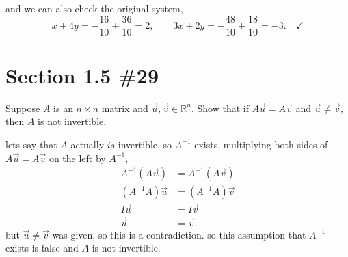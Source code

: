 \documentclass[12pt]{article}
\begin{document}
and we can also check the original system,
\[
x + 4y = -\frac{16}{10} + \frac{36}{10} = 2, \qquad
3x + 2y = -\frac{48}{10} + \frac{18}{10} = -3. \quad \checkmark
\]

\section*{Section 1.5 \#29}

Suppose $A$ is an $n \times n$ matrix and $\vec{u}, \vec{v} \in \mathbb{R}^n$. Show that if $A\vec{u} = A\vec{v}$ and $\vec{u} \neq \vec{v}$, then $A$ is not invertible.

\medskip

lets say that $A$ actually $is$ invertible, so $A^{-1}$ exists. multiplying both sides of $A\vec{u} = A\vec{v}$ on the left by $A^{-1}$,
\begin{align*}
A^{-1}(A\vec{u}) &= A^{-1}(A\vec{v}) \\
(A^{-1}A)\vec{u} &= (A^{-1}A)\vec{v} \\
I\vec{u} &= I\vec{v} \\
\vec{u} &= \vec{v}.
\end{align*}
but $\vec{u} \neq \vec{v}$ was given, so this is a contradiction. so this assumption that $A^{-1}$ exists is false and $A$ is not invertible.
\end{document}
